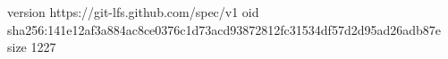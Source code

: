 version https://git-lfs.github.com/spec/v1
oid sha256:141e12af3a884ac8ce0376c1d73acd93872812fc31534df57d2d95ad26adb87e
size 1227
